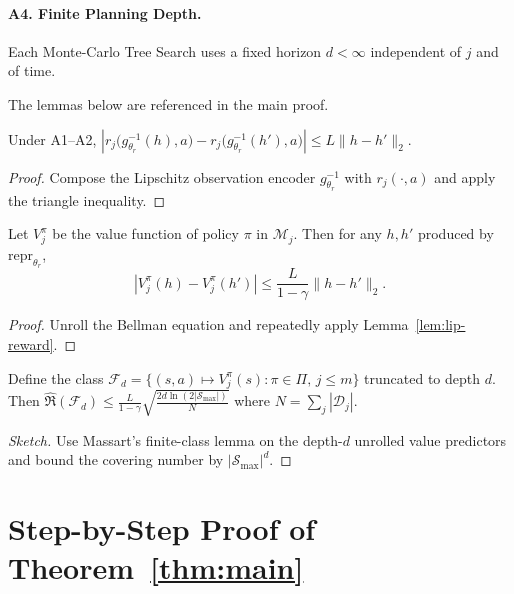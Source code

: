 \paragraph{A4. Finite Planning Depth.}
Each Monte-Carlo Tree Search uses a fixed horizon $d<\infty$ independent of
$j$ and of time.

\medskip
The lemmas below are referenced in the main proof.

\begin{lemma}\label{lem:lip-reward}
Under A1–A2,
$|r_j\!\bigl(g_{\theta_r}^{-1}(h),a\bigr)
          -r_j\!\bigl(g_{\theta_r}^{-1}(h'),a\bigr)|
\le L\lVert h-h'\rVert_2.$
\end{lemma}

\begin{proof}
Compose the Lipschitz observation encoder $g_{\theta_r}^{-1}$ with
$r_j(\cdot,a)$ and apply the triangle inequality.
\end{proof}

\begin{lemma}\label{lem:lip-value}
Let $V^{\pi}_j$ be the value function of policy $\pi$ in $\mathcal M_j$.
Then for any $h,h'$ produced by $\mathrm{repr}_{\theta_r}$,
\[
|V^{\pi}_j(h)-V^{\pi}_j(h')|
\le
\frac{L}{1-\gamma}\lVert h-h'\rVert_2 .
\]
\end{lemma}

\begin{proof}
Unroll the Bellman equation and repeatedly apply
Lemma~\ref{lem:lip-reward}.
\end{proof}

\begin{lemma}\label{lem:rad-helper}
Define the class
$\mathcal F_d=\{(s,a)\mapsto V^{\pi}_j(s) :
               \pi\in\Pi,\, j\le m\}$ truncated to depth $d$.
Then
$\widehat{\mathfrak R}(\mathcal F_d)
  \le \frac{L}{1-\gamma}\sqrt{\frac{2d\ln(2|\mathcal S_{\max}|)}{N}}
$ where $N=\sum_j|\mathcal D_j|$.
\end{lemma}

\begin{proof}[Sketch]
Use Massart’s finite-class lemma on the depth-$d$ unrolled value predictors
and bound the covering number by $|\mathcal S_{\max}|^{d}$.
\end{proof}

\section{Step-by-Step Proof of Theorem~\ref{thm:main}}
\label{app:thm-proof}


